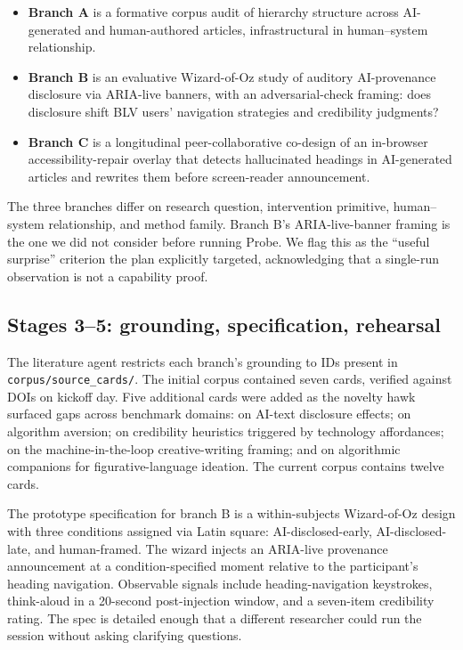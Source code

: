 \begin{itemize}
    \item \textbf{Branch A} is a formative corpus audit of hierarchy structure across AI-generated and human-authored articles, infrastructural in human--system relationship.
    \item \textbf{Branch B} is an evaluative Wizard-of-Oz study of auditory AI-provenance disclosure via ARIA-live banners, with an adversarial-check framing: does disclosure shift BLV users' navigation strategies and credibility judgments?
    \item \textbf{Branch C} is a longitudinal peer-collaborative co-design of an in-browser accessibility-repair overlay that detects hallucinated headings in AI-generated articles and rewrites them before screen-reader announcement.
\end{itemize}

The three branches differ on research question, intervention primitive, human--system relationship, and method family. Branch B's ARIA-live-banner framing is the one we did not consider before running Probe. We flag this as the ``useful surprise'' criterion the plan explicitly targeted, acknowledging that a single-run observation is not a capability proof.

\subsection{Stages 3--5: grounding, specification, rehearsal}

The literature agent restricts each branch's grounding to IDs present in \texttt{corpus/source\_cards/}. The initial corpus contained seven cards, verified against DOIs on kickoff day. Five additional cards were added as the novelty hawk surfaced gaps across benchmark domains: \citet{jakesch2023cowriting} on AI-text disclosure effects; \citet{longoni2019medical} on algorithm aversion; \citet{sundar2008main} on credibility heuristics triggered by technology affordances; \citet{clark2018machineintheloop} on the machine-in-the-loop creative-writing framing; and \citet{gero2019metaphoria} on algorithmic companions for figurative-language ideation. The current corpus contains twelve cards.

The prototype specification for branch B is a within-subjects Wizard-of-Oz design with three conditions assigned via Latin square: AI-disclosed-early, AI-disclosed-late, and human-framed. The wizard injects an ARIA-live provenance announcement at a condition-specified moment relative to the participant's heading navigation. Observable signals include heading-navigation keystrokes, think-aloud in a 20-second post-injection window, and a seven-item credibility rating. The spec is detailed enough that a different researcher could run the session without asking clarifying questions.

